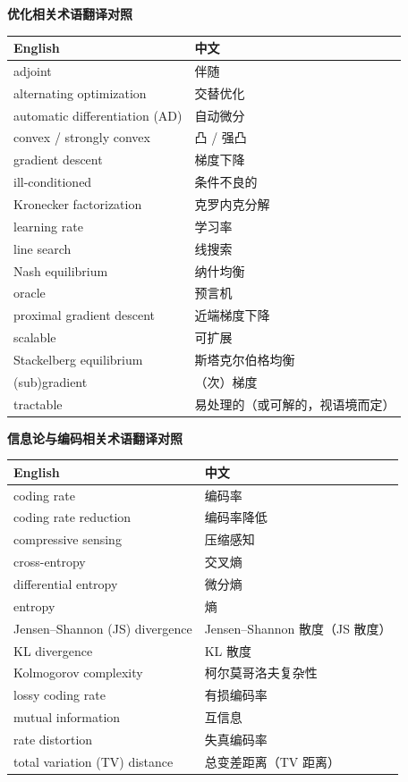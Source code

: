 \bigskip 

\begin{center}
\textbf{优化相关术语翻译对照}

\vspace{0.3em}

\begin{tabular}{ll}
\hline
\textbf{English} & \textbf{中文} \\
\hline
adjoint & 伴随 \\
alternating optimization & 交替优化 \\
automatic differentiation (AD) & 自动微分 \\
convex / strongly convex & 凸 / 强凸 \\
gradient descent & 梯度下降 \\
ill-conditioned & 条件不良的 \\
Kronecker factorization & 克罗内克分解 \\
learning rate & 学习率 \\
line search & 线搜索 \\
Nash equilibrium & 纳什均衡 \\
oracle & 预言机 \\
proximal gradient descent & 近端梯度下降 \\
scalable & 可扩展 \\
Stackelberg equilibrium & 斯塔克尔伯格均衡 \\
(sub)gradient & （次）梯度 \\
tractable & 易处理的（或可解的，视语境而定） \\
\hline
\end{tabular}
\end{center}

\bigskip
\begin{center}
\textbf{信息论与编码相关术语翻译对照}

\vspace{0.3em}

\begin{tabular}{ll}
\hline
\textbf{English} & \textbf{中文} \\
\hline
coding rate & 编码率 \\
coding rate reduction & 编码率降低 \\
compressive sensing & 压缩感知 \\
cross-entropy & 交叉熵 \\
differential entropy & 微分熵 \\
entropy & 熵 \\
Jensen--Shannon (JS) divergence & Jensen--Shannon 散度（JS 散度） \\
KL divergence & KL 散度 \\
Kolmogorov complexity & 柯尔莫哥洛夫复杂性 \\
lossy coding rate & 有损编码率 \\
mutual information & 互信息 \\
rate distortion & 失真编码率 \\
total variation (TV) distance & 总变差距离（TV 距离） \\
\hline
\end{tabular}
\end{center}

